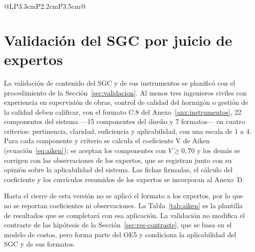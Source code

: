 \begin{table}[H]
\begin{tabularx}{\linewidth}{@{}LP{3.3cm}P{2.2cm}P{3.5cm}@{}}
\bottomrule
\end{tabularx}
\end{table}

\section{Validación del SGC por juicio de expertos}
\label{sec:resultados-expertos}

La validación de contenido del SGC y de sus instrumentos se planificó con el procedimiento de la Sección~\ref{sec:validacion}. Al menos tres ingenieros civiles con experiencia en supervisión de obras, control de calidad del hormigón o gestión de la calidad deben calificar, con el formato C.8 del Anexo~\ref{anx:instrumentos}, 22 componentes del sistema ---15 componentes del diseño y 7 formatos--- en cuatro criterios: pertinencia, claridad, suficiencia y aplicabilidad, con una escala de 1 a 4. Para cada componente y criterio se calcula el coeficiente V de Aiken (ecuación~\ref{eq:aiken}); se aceptan los componentes con $V \geq 0{,}70$ y los demás se corrigen con las observaciones de los expertos, que se registran junto con su opinión sobre la aplicabilidad del sistema. Las fichas firmadas, el cálculo del coeficiente y los currículos resumidos de los expertos se incorporan al Anexo~D.

Hasta el cierre de esta versión no se aplicó el formato a los expertos, por lo que no se reportan coeficientes ni observaciones. La Tabla~\ref{tab:aiken} es la plantilla de resultados que se completará con esa aplicación. La validación no modifica el contraste de las hipótesis de la Sección~\ref{sec:res-contraste}, que se basa en el modelo de costos, pero forma parte del OE5 y condiciona la aplicabilidad del SGC y de sus formatos. 

